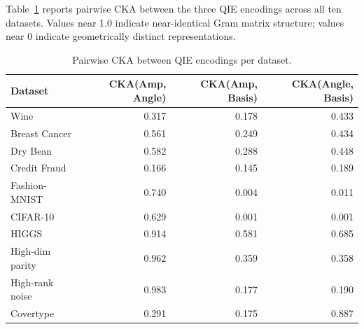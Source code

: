 \documentclass[12pt]{article}
\begin{document}
Table~\ref{tab:cka_full} reports pairwise CKA between the three QIE encodings
across all ten datasets.
Values near 1.0 indicate near-identical Gram matrix structure; values near 0
indicate geometrically distinct representations.

\begin{table}[H]
\centering
\caption{Pairwise CKA between QIE encodings per dataset.}
\label{tab:cka_full}
\small
\begin{tabular}{lrrr}
\toprule
Dataset & CKA(Amp, Angle) & CKA(Amp, Basis) & CKA(Angle, Basis) \\
\midrule
Wine            & 0.317 & 0.178 & 0.433 \\
Breast Cancer   & 0.561 & 0.249 & 0.434 \\
Dry Bean        & 0.582 & 0.288 & 0.448 \\
Credit Fraud    & 0.166 & 0.145 & 0.189 \\
Fashion-MNIST   & 0.740 & 0.004 & 0.011 \\
CIFAR-10        & 0.629 & 0.001 & 0.001 \\
HIGGS           & 0.914 & 0.581 & 0.685 \\
High-dim parity & 0.962 & 0.359 & 0.358 \\
High-rank noise & 0.983 & 0.177 & 0.190 \\
Covertype       & 0.291 & 0.175 & 0.887 \\
\bottomrule
\end{tabular}
\end{table}
\end{document}
